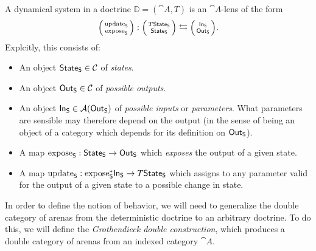 \documentclass[DynamicalBook]{subfiles}
\begin{document}
\begin{definition}\label{def.doctrine_system}
A dynamical system in a doctrine $\mathbb{D} = (\cat{A}, T)$ is an $\cat{A}$-lens of the form
\[
\lens{\update{S}}{\expose{S}} : \lens{T\State{S}}{\State{S}} \fromto \lens{\In{S}}{\Out{S}}.
\]
Explcitly, this consists of:
\begin{itemize}
  \item An object $\mathsf{State}_{\mathsf{S}} \in \mathcal{C}$ of \emph{states}.
  \item An object $\mathsf{Out}_{\mathsf{S}} \in \mathcal{C}$ of \emph{possible outputs}.
  \item An object $\mathsf{In}_{\mathsf{S}} \in \mathcal{A}(\mathsf{Out}_{\mathsf{S}})$ of \emph{possible inputs} or
    \emph{parameters}. What parameters are sensible may therefore depend on the
    output (in the sense of being an object of a category which depends for its
    definition on $\mathsf{Out}_{\mathsf{S}}$).
  \item A map $\mathrm{expose}_{\mathsf{S}} : \mathsf{State}_{\mathsf{S}} \to \mathsf{Out}_{\mathsf{S}}$ which \emph{exposes} the
    output of a given state.
  \item A map $\mathrm{update}_{\mathsf{S}} : \mathrm{expose}_{\mathsf{S}}^{\ast} \mathsf{In}_{\mathsf{S}} \to T\mathsf{State}_{\mathsf{S}}$ which
    assigns to any parameter valid for the output of a given state to a possible
    change in state.
\end{itemize}
\end{definition}

In order to define the notion of behavior, we will need to generalize the double
category of arenas from the deterministic doctrine to an arbitrary doctrine. To
do this, we will define the \emph{Grothendieck double construction}, which
produces a double category of arenas from an indexed category $\cat{A}$.
\end{document}
